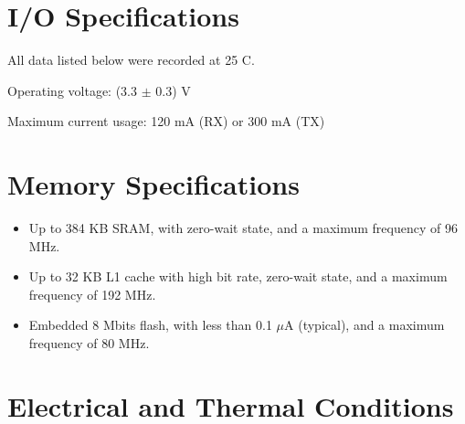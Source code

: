 \documentclass{scrreprt}
\newcommand{\modelno}{\texttt{WL11M1000}}
\begin{document}
\begin{CJK*}{UTF8}{gbsn}
\section{I/O Specifications}

All data listed below were recorded at 25 \degree C.

Operating voltage: (3.3 $\pm$ 0.3) V

Maximum current usage: 120 mA (RX) or 300 mA (TX)

\begin{table}[H]
\caption{I/O specifications for the \modelno\ wireless module under the IEEE 802.11b standard.}
\centering{}
\end{table}

\begin{table}[H]
\caption{I/O specifications for the \modelno\ wireless module under the IEEE 802.11g standard.}
\centering{}
\end{table}

\begin{table}[H]
\caption{I/O specifications for the \modelno\ wireless module under the IEEE 802.11n standard.}
\centering{}
\end{table}

\section{Memory Specifications}

\begin{itemize}
\item Up to 384 KB SRAM, with zero-wait state, and a maximum frequency of 96 MHz.
\item Up to 32 KB L1 cache with high bit rate, zero-wait state, and a maximum frequency of 192 MHz.
\item Embedded 8 Mbits flash, with less than 0.1 $\mu$A (typical), and a maximum frequency of 80 MHz.
\end{itemize}

\section{Electrical and Thermal Conditions}

\begin{table}[H]
\caption[width=\textwidth]{Temperature limit ratings for the \modelno\ wireless module.}
\centering{}
\end{table}


\end{CJK*}
\end{document}
